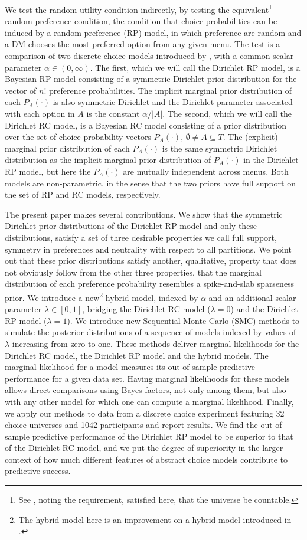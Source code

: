 \documentclass[11pt,letter]{article}
\newcommand{\Dpi}{Dirichlet RP model}
\newcommand{\DP}{Dirichlet RC model}
\begin{document}
We test the random utility condition indirectly, by testing the equivalent\footnote{See , noting the requirement, satisfied here, that the universe be countable.} random preference condition, the condition that choice probabilities can be induced by a random preference (RP) model, in which preference are random and a DM chooses the most preferred option from any given menu.
The test is a comparison of two discrete choice models introduced by , with a common scalar parameter $\alpha \in (0,\infty)$.
The first, which we will call the \Dpi{}, is a Bayesian RP model consisting of a symmetric Dirichlet prior distribution for the vector of $n!$ preference probabilities.
The implicit marginal prior distribution of each $P_A(\cdot)$ is also symmetric Dirichlet and the Dirichlet parameter associated with each option in $A$ is the constant $\alpha/|A|$.
The second, which we will call the \DP{}, is a Bayesian RC model consisting of a prior distribution over the set of choice probability vectors $P_A(\cdot)$, $\emptyset \neq A \subseteq T$.
The (explicit) marginal prior distribution of each $P_A(\cdot)$ is the same symmetric Dirichlet distribution as the implicit marginal prior distribution of $P_A(\cdot)$ in the \Dpi{}, but here the $P_A(\cdot)$ are mutually independent across menus.
Both models are non-parametric, in the sense that the two priors have full support on the set of RP and RC models, respectively.

The present paper makes several contributions.
We show that the symmetric Dirichlet prior distributions of the \Dpi{} and only these distributions, satisfy a set of three desirable properties we call full support, symmetry in preferences and neutrality with respect to all partitions.
We point out that these prior distributions satisfy another, qualitative, property that does not obviously follow from the other three properties, that the marginal distribution of each preference probability resembles a spike-and-slab sparseness prior.
We introduce a new\footnote{The hybrid model here is an improvement on a hybrid model introduced in .} hybrid model, indexed by $\alpha$ and an additional scalar parameter $\lambda \in [0,1]$, bridging the \DP{} ($\lambda = 0$) and the \Dpi{} ($\lambda = 1$).
We introduce new Sequential Monte Carlo (SMC) methods to simulate the posterior distributions of a sequence of models indexed by values of $\lambda$ increasing from zero to one.
These methods deliver marginal likelihoods for the \DP{}, the \Dpi{} and the hybrid models.
The marginal likelihood for a model measures its out-of-sample predictive performance for a given data set.
Having marginal likelihoods for these models allows direct comparisons using Bayes factors, not only among them, but also with any other model for which one can compute a marginal likelihood.
Finally, we apply our methods to data from a discrete choice experiment featuring 32 choice universes and 1042 participants and report results.
We find the out-of-sample predictive performance of the \Dpi{} to be superior to that of the \DP{}, and we put the degree of superiority in the larger context of how much different features of abstract choice models contribute to predictive success.
\end{document}
